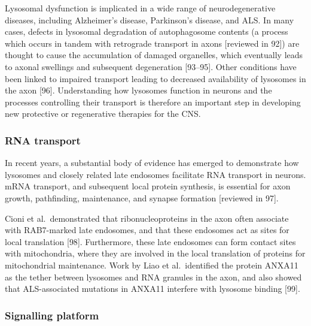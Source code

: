 \documentclass[
  12pt,
  a4paper,
]{book}
\begin{document}
Lysosomal dysfunction is implicated in a wide range of neurodegenerative diseases, including Alzheimer's disease, Parkinson's disease, and ALS. In many cases, defects in lysosomal degradation of autophagosome contents (a process which occurs in tandem with retrograde transport in axons {[}reviewed in 92{]}) are thought to cause the accumulation of damaged organelles, which eventually leads to axonal swellings and subsequent degeneration {[}93--95{]}. Other conditions have been linked to impaired transport leading to decreased availability of lysosomes in the axon {[}96{]}. Understanding how lysosomes function in neurons and the processes controlling their transport is therefore an important step in developing new protective or regenerative therapies for the CNS.

\hypertarget{rna-transport}{%
\subsubsection{RNA transport}\label{rna-transport}}

In recent years, a substantial body of evidence has emerged to demonstrate how lysosomes and closely related late endosomes facilitate RNA transport in neurons. mRNA transport, and subsequent local protein synthesis, is essential for axon growth, pathfinding, maintenance, and synapse formation {[}reviewed in 97{]}.

Cioni et al.~demonstrated that ribonucleoproteins in the axon often associate with RAB7-marked late endosomes, and that these endosomes act as sites for local translation {[}98{]}. Furthermore, these late endosomes can form contact sites with mitochondria, where they are involved in the local translation of proteins for mitochondrial maintenance. Work by Liao et al.~identified the protein ANXA11 as the tether between lysosomes and RNA granules in the axon, and also showed that ALS-associated mutations in ANXA11 interfere with lysosome binding {[}99{]}.

\hypertarget{signalling-platform}{%
\subsubsection{Signalling platform}\label{signalling-platform}}
\end{document}
